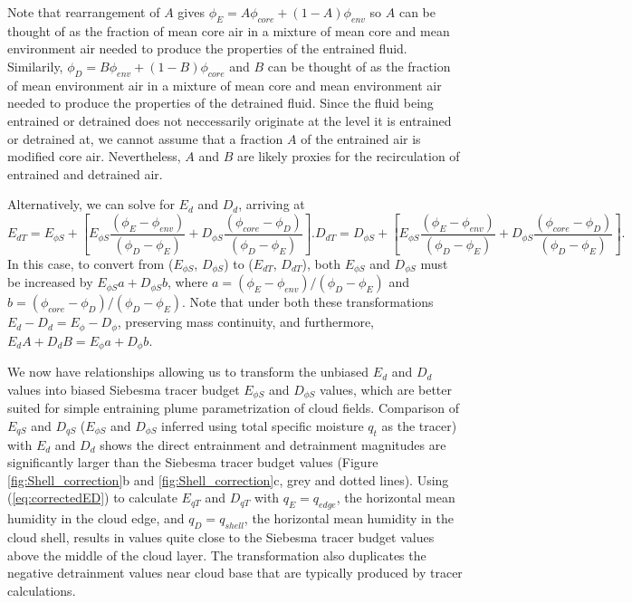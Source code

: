 \documentclass[12pt]{article}
\begin{document}
Note that rearrangement of $A$ gives $\phi_E = A \phi_{core} + (1-A)\phi_{env}$
so $A$ can be thought of as the fraction of mean core air in a mixture of mean 
core and mean environment air needed to produce the properties of the entrained 
fluid.  Similarily, $\phi_D = B \phi_{env} + (1-B)\phi_{core}$ and 
$B$ can be thought of as the fraction of mean environment air in a mixture of 
mean core and mean environment air needed to produce the properties of the 
detrained fluid.  Since the fluid being entrained or detrained does not 
neccessarily originate at the level it is entrained or detrained at, we cannot 
assume that a fraction $A$ of the entrained air is modified core air.  
Nevertheless, $A$ and $B$ are likely proxies for the recirculation of entrained 
and detrained air.

Alternatively, we can solve for $E_d$ and $D_d$, arriving at
\begin{subequations}
\begin{equation}
  \label{eq:corrected_entrainment2}
    E_{d T} = E_{\phi S} 
        + \left[E_{\phi S}\frac{(\phi_E - \phi_{env})}
                               {(\phi_D - \phi_E)} 
              + D_{\phi S}\frac{(\phi_{core} - \phi_D)}
                               {(\phi_D - \phi_E)}\right].
\end{equation}
\begin{equation}
  \label{eq:corrected_detrainment2}
    D_{d T} = D_{\phi S} 
        + \left[E_{\phi S}\frac{(\phi_E - \phi_{env})}
                               {(\phi_D - \phi_E)}
              + D_{\phi S}\frac{(\phi_{core} - \phi_D)}
                               {(\phi_D - \phi_E)}\right].
\end{equation}
\end{subequations}
In this case, to convert from ($E_{\phi S}$, $D_{\phi S}$) to
($E_{dT}$, $D_{dT}$), both $E_{\phi S}$ and $D_{\phi S}$ must be
increased by $E_{\phi S} a + D_{\phi S} b$, where 
$a = (\phi_E - \phi_{env})/(\phi_D - \phi_E)$ and 
$b = (\phi_{core} -\phi_D)/(\phi_D - \phi_E)$.  Note that under both these
transformations $E_d-D_d = E_{\phi}-D_{\phi}$, preserving mass
continuity, and furthermore, $E_d A + D_d B = E_{\phi} a + D_{\phi}
b$.

We now have relationships allowing us to transform the unbiased
$E_{d}$ and $D_{d}$ values into biased Siebesma tracer budget
$E_{\phi S}$ and $D_{\phi S}$ values, which are better suited for
simple entraining plume parametrization of cloud fields.
Comparison of $E_{q S}$ and $D_{q S}$ ($E_{\phi S}$ and $D_{\phi S}$ inferred
using total specific moisture $q_t$ as the tracer) with $E_d$ and $D_d$
shows the direct entrainment and detrainment magnitudes are significantly larger 
than the Siebesma tracer budget values (Figure \ref{fig:Shell_correction}b 
and \ref{fig:Shell_correction}c, grey and dotted lines).  
Using (\ref{eq:correctedED}) to calculate $E_{q T}$ and $D_{q T}$ with
$q_E = q_{edge}$, the horizontal mean humidity in the cloud edge, and 
$q_D = q_{shell}$, the horizontal mean humidity in the cloud shell, results in 
values quite close to the Siebesma tracer budget values above the middle of the 
cloud layer. The transformation also duplicates the negative detrainment values 
near cloud base that are typically produced by tracer calculations.
\end{document}

